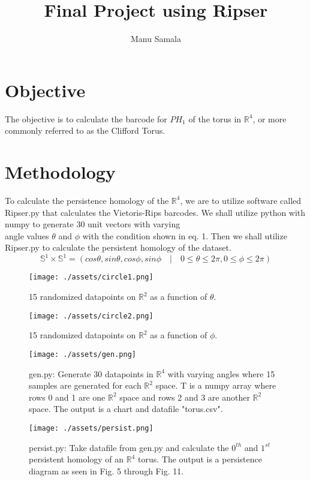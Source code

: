 \documentclass[letterpaper, 12pt]{report}
\title{Final Project using Ripser}
\author{Manu Samala}
\begin{document}
	\section{Objective}
	The objective is to calculate the barcode for $PH_1$ of the torus in 
	$\mathbb{R}^4$, or more commonly referred to as the Clifford Torus.

	\section{Methodology}
	To calculate the persistence homology of the $\mathbb{R}^4$, we are to
	utilize software called Ripser.py that calculates the Vietoris-Rips barcodes.
	We shall utilize python with numpy to generate 30 unit vectors with
	varying \\ angle values $\theta$ and $\phi$ with the condition shown in
	eq. 1. Then we shall utilize Ripser.py to calculate
	the persistent homology of the dataset.
	\begin{equation}
		\mathbb{S}^1 \times \mathbb{S}^1 = { (cos \theta, sin \theta, cos \phi,
		sin \phi \quad | \quad 0 \leq \theta \leq 2\pi, 0 \leq \phi \leq 2 \pi) }
	\end{equation}

	\begin{figure}[ht]
	  \centering
	  \texttt{[image: ./assets/circle1.png]}
	  \caption{15 randomized datapoints on $\mathbb{R}^2$ as a function of $\theta$.}
	  \label{fig:cir1}
	\end{figure}
	\newpage

	\begin{figure}[ht]
	  \centering
	  \texttt{[image: ./assets/circle2.png]}
	  \caption{15 randomized datapoints on $\mathbb{R}^2$ as a function of $\phi$.}
	  \label{fig:cir2}
	\end{figure}

	\begin{figure}
		\texttt{[image: ./assets/gen.png]}
		\caption{gen.py: Generate 30 datapoints in $\mathbb{R}^4$ with varying
		angles where 15 samples are generated for each $\mathbb{R}^2$ space. T
		is a numpy array where rows 0 and 1 are one $\mathbb{R}^2$ space and 
		rows 2 and 3 are another $\mathbb{R}^2$ space.
		The output is a chart and datafile "torus.csv".}
		\label{fig:code1}
	\end{figure}

	\begin{figure}
		\texttt{[image: ./assets/persist.png]}
		\caption{persist.py: Take datafile from gen.py and calculate the $0^{th}$ 
			and $1^{st}$ persistent homology of an $\mathbb{R}^4$ torus. 
			The output is a persistence diagram as seen in Fig. 5 through
			Fig. 11.}
		\label{fig:code2}
	\end{figure}
	
\end{document}
